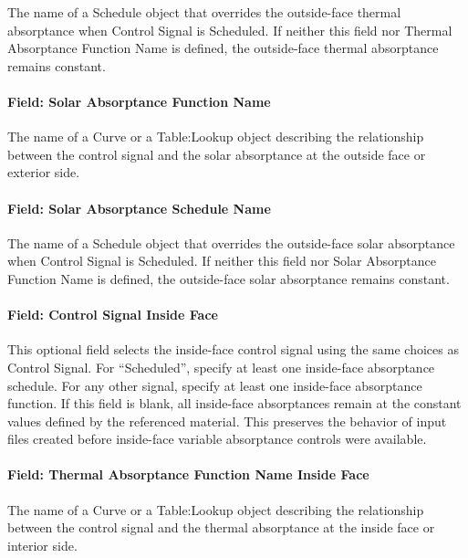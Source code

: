 The name of a Schedule object that overrides the outside-face thermal absorptance when Control Signal is Scheduled. If neither this field nor Thermal Absorptance Function Name is defined, the outside-face thermal absorptance remains constant.

\paragraph{Field: Solar Absorptance Function Name}\label{field-solar-absorptance-function-name}

The name of a Curve or a Table:Lookup object describing the relationship between the control signal and the solar absorptance at the outside face or exterior side.

\paragraph{Field: Solar Absorptance Schedule Name}\label{field-solar-absorptance-schedule-name}

The name of a Schedule object that overrides the outside-face solar absorptance when Control Signal is Scheduled. If neither this field nor Solar Absorptance Function Name is defined, the outside-face solar absorptance remains constant.

\paragraph{Field: Control Signal Inside Face}\label{field-control-signal-inside-face}

This optional field selects the inside-face control signal using the same choices as Control Signal. For ``Scheduled'', specify at least one inside-face absorptance schedule. For any other signal, specify at least one inside-face absorptance function. If this field is blank, all inside-face absorptances remain at the constant values defined by the referenced material. This preserves the behavior of input files created before inside-face variable absorptance controls were available.

\paragraph{Field: Thermal Absorptance Function Name Inside Face}\label{field-thermal-absorptance-function-name-inside-face}

The name of a Curve or a Table:Lookup object describing the relationship between the control signal and the thermal absorptance at the inside face or interior side.

